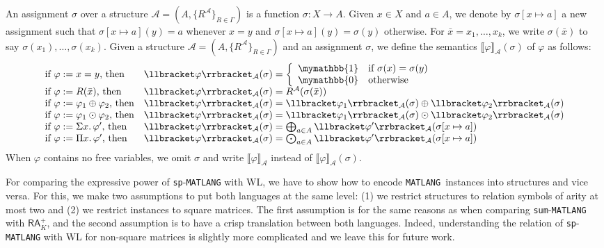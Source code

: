 \documentclass[sigconf]{acmart}
\newcommand{\lang}{\texttt{MATLANG}\xspace}
\newcommand{\langsum}{\texttt{sum}-\texttt{MATLANG}\xspace}
\newcommand{\langprod}{\texttt{sp}-\texttt{MATLANG}\xspace}
\newcommand{\ksum}{\oplus}
\newcommand{\kprod}{\odot}
\newcommand{\bigksum}{\bigoplus}
\newcommand{\bigkprod}{\bigodot}
\newcommand{\kzero}{\mymathbb{0}}
\newcommand{\kone}{\mymathbb{1}}
\newcommand{\ssem}[2]{\llbracket #1 \rrbracket_{#2}}
\newcommand{\cA}{\mathcal{A}}
\begin{document}
An assignment $\sigma$ over a structure $\cA = (A, \{R^\cA\}_{R \in \Gamma})$ is a function $\sigma: X \rightarrow A$. Given $x \in X$ and $a \in A$, we denote by $\sigma[x \mapsto a]$ a new assignment such that $\sigma[x \mapsto a](y) = a$ whenever $x = y$ and $\sigma[x \mapsto a](y) = \sigma(y)$ otherwise. For $\bar{x} = x_1, \ldots, x_k$,  we write $\sigma(\bar{x})$ to say $\sigma(x_1),\ldots, \sigma(x_k)$. Given a structure $\cA = (A, \{R^\cA\}_{R \in \Gamma})$ and an assignment $\sigma$, we define the semantics $\ssem{\varphi}{\cA}(\sigma)$ of $\varphi$ as follows:
$$
\begin{array}{ll}
\text{if $\varphi := x = y$, then} & \ssem{\varphi}{\cA}(\sigma) = 
\left\{
\begin{array}{ll}
\kone & \text{if $\sigma(x) = \sigma(y)$} \\
\kzero & \text{otherwise}
\end{array}
\right. \\
\text{if $\varphi := R(\bar{x})$, then} & \ssem{\varphi}{\cA}(\sigma) = R^\cA(\sigma(\bar{x})) \\
\text{if $\varphi := \varphi_1 \ksum \varphi_2$, then} & \ssem{\varphi}{\cA}(\sigma) = \ssem{\varphi_1}{\cA}(\sigma) \ksum \ssem{\varphi_2}{\cA}(\sigma)  \\
\text{if $\varphi := \varphi_1 \kprod \varphi_2$, then} & \ssem{\varphi}{\cA}(\sigma) = \ssem{\varphi_1}{\cA}(\sigma) \kprod \ssem{\varphi_2}{\cA}(\sigma)  \\
\text{if $\varphi := \Sigma x. \, \varphi'$, then} & \ssem{\varphi}{\cA}(\sigma) =  \bigksum_{a \in A} \ssem{\varphi'}{\cA}(\sigma[x \mapsto a]) \\
\text{if $\varphi := \Pi x. \, \varphi'$, then} & \ssem{\varphi}{\cA}(\sigma) =  \bigkprod_{a \in A} \ssem{\varphi'}{\cA}(\sigma[x \mapsto a])
\end{array}
$$
When $\varphi$ contains no free variables, we omit $\sigma$ and write $\ssem{\varphi}{\cA}$ instead of $\ssem{\varphi}{\cA}(\sigma)$.

For comparing the expressive power of \langprod with WL, we have to show how to encode \lang\ instances into structures and vice versa. For this, we make two assumptions to put both languages at the same level: (1) we restrict structures to relation symbols of arity at most two and (2) we restrict instances to square matrices. The first assumption is for the same reasons as when comparing \langsum with $\mathsf{RA}_K^+$, and the second assumption is to have a crisp translation between both languages. Indeed, understanding the relation of \langprod with WL for non-square matrices is slightly more complicated and we leave this for future work. 
\end{document}
